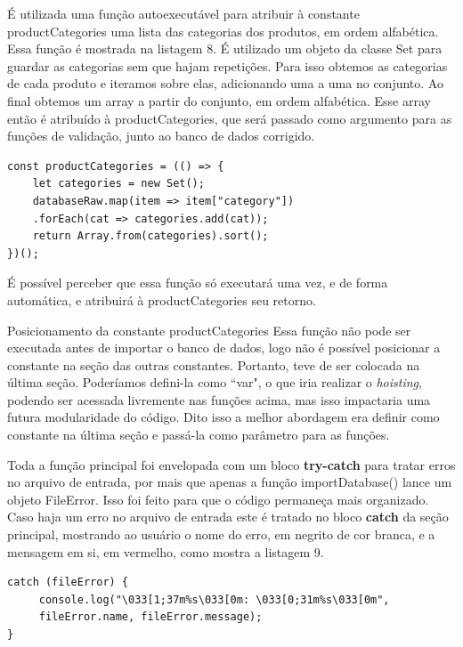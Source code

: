 \documentclass[12pt]{article}
\begin{document}
É utilizada uma função autoexecutável para atribuir à constante productCategories uma lista das categorias dos produtos, em ordem alfabética. Essa função é mostrada na listagem 8. É utilizado um objeto da classe Set para guardar as categorias sem que hajam repetições. Para isso obtemos as categorias de cada produto e iteramos sobre elas, adicionando uma a uma no conjunto. Ao final obtemos um array a partir do conjunto, em ordem alfabética. Esse array então é atribuído à productCategories, que será passado como argumento para as funções de validação, junto ao banco de dados corrigido.
\begin{lstlisting}[caption=Lista productCategories]
const productCategories = (() => {
    let categories = new Set();
    databaseRaw.map(item => item["category"])
    .forEach(cat => categories.add(cat));
    return Array.from(categories).sort();
})();
\end{lstlisting}

É possível perceber que essa função só executará uma vez, e de forma automática, e atribuirá à productCategories seu retorno.

\begin{myframe}{Posicionamento da constante productCategories} 
Essa função não pode ser executada antes de importar o banco de dados, logo não é possível posicionar a constante na seção das outras constantes. Portanto, teve de ser colocada na última seção. Poderíamos defini-la como ``var", o que iria realizar o \textit{hoisting}, podendo ser acessada livremente nas funções acima, mas isso impactaria uma futura modularidade do código. Dito isso a melhor abordagem era definir como constante na última seção e passá-la como parâmetro para as funções.
\end{myframe}

Toda a função principal foi envelopada com um bloco \textbf{try-catch} para tratar erros no arquivo de entrada, por mais que apenas a função importDatabase() lance um objeto FileError. Isso foi feito para que o código permaneça mais organizado. Caso haja um erro no arquivo de entrada este é tratado no bloco \textbf{catch} da seção principal, mostrando ao usuário o nome do erro, em negrito de cor branca, e a mensagem em si, em vermelho, como mostra a listagem 9.

\begin{lstlisting}[caption=Tratamento do erro FileError]
catch (fileError) {
     console.log("\033[1;37m%s\033[0m: \033[0;31m%s\033[0m",
     fileError.name, fileError.message);
}
\end{lstlisting}
\end{document}
